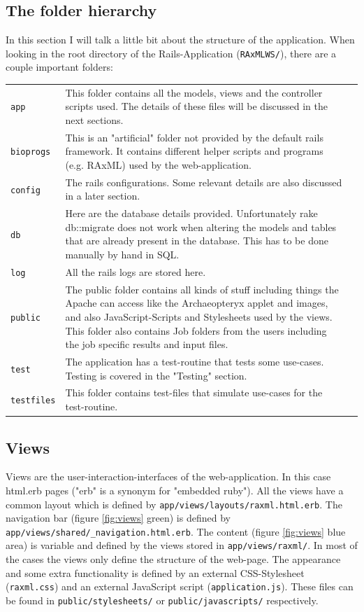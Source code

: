 \documentclass{scrartcl}
\begin{document}
		\subsection{The folder hierarchy}	
			In this section I will talk a little bit about the structure of the application.
			When looking in the root directory of the Rails-Application (\texttt{RAxMLWS/}), there are a couple important folders: \\
			\begin{tabular}[c]{lp{12cm}l}
			\texttt{app} &  This folder contains all the models, views and the controller  scripts used. The details of these files will be discussed in the next sections. \\
				\texttt{bioprogs} & This is an "artificial" folder not provided by the default rails framework. It contains different helper scripts and programs (e.g. RAxML) used by the web-application. \\
				\texttt{config} & The rails configurations. Some relevant details are also discussed in a later section. \\
				\texttt{db} &	Here are the database details provided. Unfortunately rake db::migrate does not work when altering the models and tables that are already present in the database. This has to be done manually by hand in SQL.  \\
				\texttt{log} & All the rails logs are stored here. \\
				\texttt{public} & The public folder contains all kinds of stuff including things the Apache can access like the Archaeopteryx applet and images, and also JavaScript-Scripts and Stylesheets used by the views. This folder also contains Job folders from the users including the job specific results and input files. \\
				\texttt{test} & The application has a test-routine that tests some use-cases. Testing is covered in the "Testing" section. \\
				\texttt{testfiles} & This folder contains test-files that simulate use-cases for the test-routine. \\
			\end{tabular}
		
		
		\subsection{Views}
			Views are the user-interaction-interfaces of the web-application. In this case html.erb pages ("erb" is a synonym for "embedded ruby"). All the views have a common layout which is defined by  \texttt{app/views/layouts/raxml.html.erb}. The navigation bar (figure \ref{fig:views} green) is defined by \texttt{app/views/shared/\_navigation.html.erb}. The content (figure \ref{fig:views} blue area) is variable and defined by the views stored in \texttt{app/views/raxml/}. In most of the cases the views only define the structure of the web-page. The appearance and some extra functionality is defined by an external CSS-Stylesheet (\texttt{raxml.css}) and an external JavaScript script (\texttt{application.js}). These files can be found  in \texttt{public/stylesheets/} or \texttt{public/javascripts/} respectively. 
			
\end{document}
